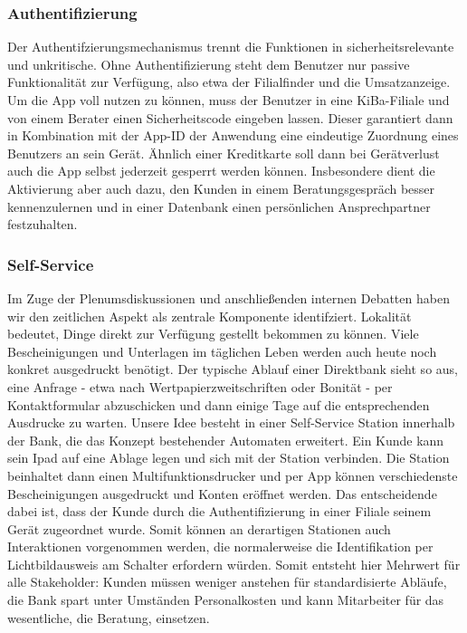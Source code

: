 \subsubsection{Authentifizierung}
	Der Authentifzierungsmechanismus trennt die Funktionen in sicherheitsrelevante und unkritische. Ohne Authentifizierung steht dem Benutzer nur passive Funktionalität zur Verfügung, also etwa der Filialfinder und die Umsatzanzeige. Um die App voll nutzen zu können, muss der Benutzer in eine KiBa-Filiale und von einem Berater einen Sicherheitscode eingeben lassen. Dieser garantiert dann in Kombination mit der App-ID der Anwendung eine eindeutige Zuordnung eines Benutzers an sein Gerät.
	 Ähnlich einer Kreditkarte soll dann bei Gerätverlust auch die App selbst jederzeit gesperrt werden können. Insbesondere dient die Aktivierung aber auch dazu, den Kunden in einem Beratungsgespräch besser kennenzulernen und in einer Datenbank einen persönlichen Ansprechpartner festzuhalten.
	
\subsubsection{Self-Service}
Im Zuge der Plenumsdiskussionen und anschließenden internen Debatten haben wir den zeitlichen Aspekt als zentrale Komponente identifziert. Lokalität bedeutet, Dinge direkt zur Verfügung gestellt bekommen zu können. Viele Bescheinigungen und Unterlagen im täglichen Leben werden auch heute noch konkret ausgedruckt benötigt. Der typische Ablauf einer Direktbank sieht so aus, eine Anfrage - etwa nach Wertpapierzweitschriften oder Bonität - per Kontaktformular abzuschicken und dann einige Tage auf die entsprechenden Ausdrucke zu warten. Unsere Idee besteht in einer Self-Service Station innerhalb der Bank, die das Konzept bestehender Automaten erweitert. Ein Kunde kann sein Ipad auf eine Ablage legen und sich mit der Station verbinden. Die Station beinhaltet dann einen Multifunktionsdrucker und per App können verschiedenste Bescheinigungen ausgedruckt und Konten eröffnet werden. Das entscheidende dabei ist, dass der Kunde durch die Authentifizierung in einer Filiale seinem Gerät zugeordnet wurde. Somit können an derartigen Stationen auch Interaktionen vorgenommen werden, die normalerweise die Identifikation per Lichtbildausweis am Schalter erfordern würden. Somit entsteht hier Mehrwert für alle Stakeholder: Kunden müssen weniger anstehen für standardisierte Abläufe, die Bank spart unter Umständen Personalkosten und kann Mitarbeiter für das wesentliche, die Beratung, einsetzen.

